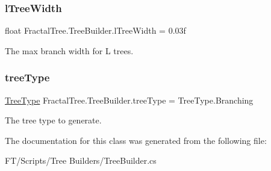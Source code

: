 \mbox{\label{class_fractal_tree_1_1_tree_builder_a382d4bba4cac7e05681e75109801dd92}} 
\subsubsection{\texorpdfstring{l\+Tree\+Width}{lTreeWidth}}
{\footnotesize\ttfamily float Fractal\+Tree.\+Tree\+Builder.\+l\+Tree\+Width = 0.\+03f}



The max branch width for L trees. 

\mbox{\label{class_fractal_tree_1_1_tree_builder_aa2f66ebffbf59d18232884f85e95490d}} 
\subsubsection{\texorpdfstring{tree\+Type}{treeType}}
{\footnotesize\ttfamily \hyperlink{class_fractal_tree_1_1_tree_builder_a955d67cfa976440cc427e591be74f979}{Tree\+Type} Fractal\+Tree.\+Tree\+Builder.\+tree\+Type = Tree\+Type.\+Branching}



The tree type to generate. 



The documentation for this class was generated from the following file\+:\begin{DoxyCompactItemize}
\item 
F\+T/\+Scripts/\+Tree Builders/Tree\+Builder.\+cs\end{DoxyCompactItemize}
